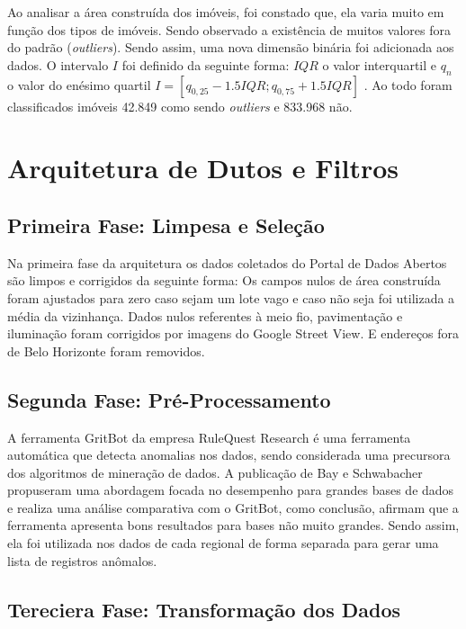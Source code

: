 \documentclass[12pt]{article}
\begin{document}
Ao analisar a área construída dos imóveis, foi constado que, ela varia muito em função dos tipos de imóveis. Sendo observado a existência de muitos valores fora do padrão (\textit{outliers}). Sendo assim, uma nova dimensão binária foi adicionada aos dados. O intervalo $I$ foi definido da seguinte forma: $IQR$ o valor interquartil e $q_n$ o valor do enésimo quartil $I = \left[ q_{0,25} - 1.5IQR;q_{0,75} + 1.5IQR  \right]$ . Ao todo foram classificados imóveis 42.849 como sendo \textit{outliers} e 833.968 não. 

\section{Arquitetura de Dutos e Filtros}

\subsection{Primeira Fase: Limpesa e Seleção}

Na primeira fase da arquitetura os dados coletados do Portal de Dados Abertos são limpos e corrigidos da seguinte forma: Os campos nulos de área construída foram ajustados para zero caso sejam um lote vago e caso não seja foi utilizada a média da vizinhança. Dados nulos referentes à meio fio, pavimentação e iluminação foram corrigidos por imagens do Google Street View\textregistered. E endereços fora de Belo Horizonte foram removidos.

\subsection{Segunda Fase: Pré-Processamento}

A ferramenta GritBot da empresa RuleQuest Research é uma ferramenta automática que detecta anomalias nos dados, sendo considerada uma precursora dos algoritmos de mineração de dados. A publicação de Bay e Schwabacher \cite{bay2003mining} propuseram uma abordagem focada no desempenho para grandes bases de dados e realiza uma análise comparativa com o GritBot, como conclusão, afirmam que a ferramenta apresenta bons resultados para bases não muito grandes. Sendo assim, ela foi utilizada nos dados de cada regional de forma separada para gerar uma lista de registros anômalos. 

\subsection{Tereciera Fase: Transformação dos Dados}
\end{document}
